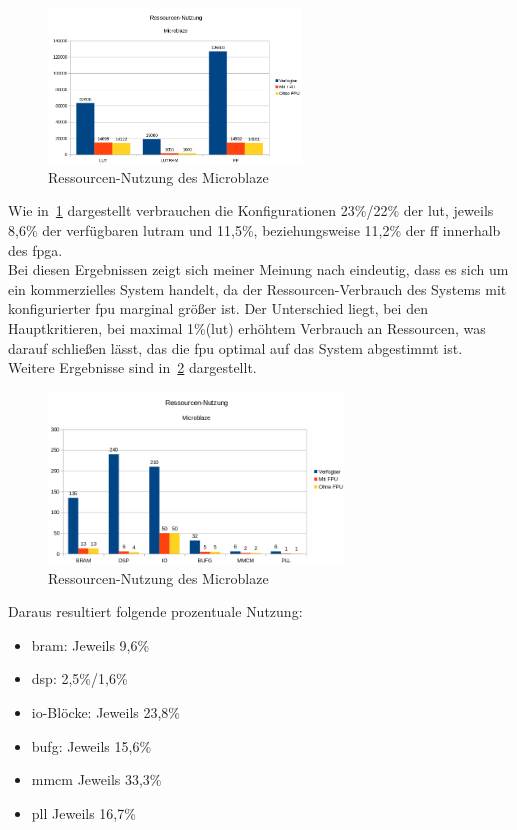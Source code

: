 \begin{figure}[H]
\centering
\includegraphics[width=0.6\textwidth]{Hauptteil/ressourcenmb1.png}
\caption{Ressourcen-Nutzung des Microblaze}
\label{fig:ressourcenmb1}
\end{figure}

Wie in~\ref{fig:ressourcenmb1} dargestellt verbrauchen die Konfigurationen 23\%/22\% der \ac{lut}, jeweils 8,6\% der verfügbaren \ac{lutram} und 11,5\%, beziehungsweise 11,2\% der \ac{ff}
innerhalb des \ac{fpga}.\\
Bei diesen Ergebnissen zeigt sich meiner Meinung nach eindeutig, dass es sich um ein kommerzielles System handelt, da der Ressourcen-Verbrauch des Systems mit konfigurierter \ac{fpu}
marginal größer ist. Der Unterschied liegt, bei den Hauptkritieren, bei maximal 1\%(\ac{lut}) erhöhtem Verbrauch an Ressourcen, was darauf schließen lässt, das die \ac{fpu} optimal auf das System
abgestimmt ist.\\

Weitere Ergebnisse sind in~\ref{fig:ressourcenmb2} dargestellt.\\

\begin{figure}[H]
\centering
\includegraphics[width=0.7\textwidth]{Hauptteil/ressourcenmb2.png}
\caption{Ressourcen-Nutzung des Microblaze}
\label{fig:ressourcenmb2}
\end{figure}

Daraus resultiert folgende prozentuale Nutzung:\\
\begin{itemize}
  \item \ac{bram}: Jeweils 9,6\%
  \item \ac{dsp}: 2,5\%/1,6\%
  \item \ac{io}-Blöcke: Jeweils 23,8\%
  \item \ac{bufg}: Jeweils 15,6\%
  \item \ac{mmcm} Jeweils 33,3\%
  \item \ac{pll} Jeweils 16,7\%
\end{itemize}

